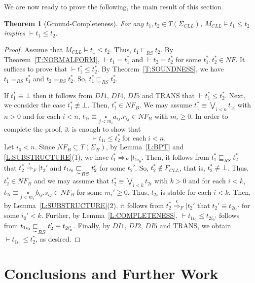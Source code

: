 \documentclass{elsarticle}
\theoremstyle{plain}
\newtheorem{theorem}{Theorem}[section]
\theoremstyle{definition}
\begin{document}
We are now ready to prove the following, the main result of this section.

\begin{theorem}[Ground-Completeness]
  For any $t_1,t_2 \in T(\Sigma_{CLL})$, $M_{CLL} \models t_1 \leqslant t_2$ implies $ \vdash t_1 \leqslant t_2$.
\end{theorem}
\begin{proof}
  Assume that $M_{CLL} \models t_1 \leqslant t_2$. Thus, $t_1 \sqsubseteq_{RS} t_2$.
  By Theorem~\ref{T:NORMALFORM}, $\vdash  t_1 = t_1^*$ and $\vdash  t_2 = t_2^*$ for some $t_1^*,t_2^* \in NF$.
  It suffices to prove that $\vdash  t_1^* \leqslant t_2^*$.
  By Theorem~\ref{T:SOUNDNESS}, we have $t_1 =_{RS} t_1^*$ and $t_2 =_{RS} t_2^*$. So, $t_1^* \sqsubseteq_{RS} t_2^*$.

   If $t_1^* \equiv \bot$ then it follows from $DI1$, $DI4$, $DI5$ and TRANS that $\vdash  t_1^* \leqslant t_2^*$.
   Next, we consider the case $t_1^* \not\equiv \bot$. Then, $t_1^* \in NF_B$.
   We may assume $t_1^* \equiv \underset{i< n}{\bigvee}t_{1i}$ with $n>0$ and for each $i<n$, $t_{1i} \equiv \underset{j<m_i}\square a_{ij}.r_{ij}\in NF_B$ with $m_i \geq 0$.
    In order to complete the proof, it is enough to show that
    \[\vdash t_{1i}\leqslant t_2^*\;\text{for each}\;i< n.\]
    Let $i_0 < n$.
    Since $NF_B \subseteq T(\Sigma_B)$, by Lemma~\ref{L:BPT} and \ref{L:SUBSTRUCTURE}(1), we have $t_1^* \stackrel{\epsilon}{\Longrightarrow}_F|t_{1i_0}$.
    Then, it follows from $t_1^* \sqsubseteq_{RS} t_2^*$ that $t_2^* \stackrel{\epsilon}{\Longrightarrow}_F| t_2'$ and $t_{1i_0}\underset{\thicksim}{\sqsubset}_{RS} t_2'$ for some $t_2'$.
    So, $t_2^* \notin F_{CLL}$, that is, $t_2^* \not\equiv \bot$.
    Thus, $t_2^* \in NF_B$ and we may assume that  $t_2^* \equiv \underset{i< k}{\bigvee}t_{2i}$ with $k>0$ and for each $i<k$, $t_{2i} \equiv \underset{j<m_i'}\square b_{ij}.s_{ij}\in NF_B$ for some $m_i' \geq 0$.
    Thus, $t_{2i}$ is stable for each $i<k$.
    Then, by Lemma~\ref{L:SUBSTRUCTURE}(2), it follows from $t_2^* \stackrel{\epsilon}{\Longrightarrow}_F| t_2'$ that $t_2' \equiv t_{2i_0'}$ for some $i_0'< k$.
    Further, by Lemma~\ref{L:COMPLETENESS}, $\vdash t_{1i_0}\leqslant t_{2i_0'}$ follows from $t_{1i_0}\underset{\thicksim}{\sqsubset}_{RS} t_2' \equiv t_{2i_0'}$.
    Finally, by $DI1$, $DI2$, $DI5$ and TRANS, we obtain $\vdash t_{1i_0}\leqslant t_2^*$, as desired.
\end{proof}

\section{Conclusions and Further Work}
\end{document}
